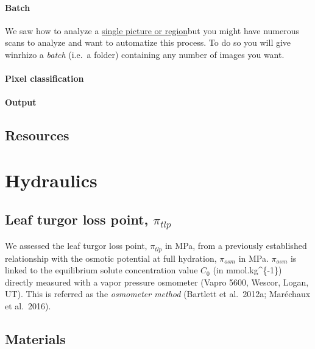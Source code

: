 \documentclass[
  12pt,
  american,
  a4paper,
  extrafontsizes,onecolumn,openright
  ]{memoir}
\begin{document}
\hypertarget{batch}{%
\subsubsection{Batch}\label{batch}}

We saw how to analyze a \protect\hyperlink{first-analysis}{single picture or region}but you might have numerous scans to analyze and want to automatize this process. To do so you will give winrhizo a \emph{batch} (i.e.~a folder) containing any number of images you want.

\hypertarget{pixel-classification}{%
\subsubsection{Pixel classification}\label{pixel-classification}}

\hypertarget{output}{%
\subsubsection{Output}\label{output}}

\hypertarget{resources}{%
\section{Resources}\label{resources}}

\hypertarget{hydraulics-1}{%
\chapter{Hydraulics}\label{hydraulics-1}}

\hypertarget{leaf-turgor-loss-point-pi_tlp}{%
\section{\texorpdfstring{Leaf turgor loss point, \(\pi_{tlp}\)}{Leaf turgor loss point, \textbackslash pi\_\{tlp\}}}\label{leaf-turgor-loss-point-pi_tlp}}

We assessed the leaf turgor loss point, \(\pi_{tlp}\) in MPa, from a previously established relationship with the osmotic potential at full hydration, \(\pi_{osm}\) in MPa. \(\pi_{osm}\) is linked to the equilibrium solute concentration value \(C_0\) (in mmol.kg\^{}\{-1\}) directly measured with a vapor pressure osmometer (Vapro 5600, Wescor, Logan, UT). This is referred as the \emph{osmometer method} (Bartlett et al.~2012a; Maréchaux et al.~2016).

\hypertarget{materials}{%
\section{Materials}\label{materials}}
\end{document}
